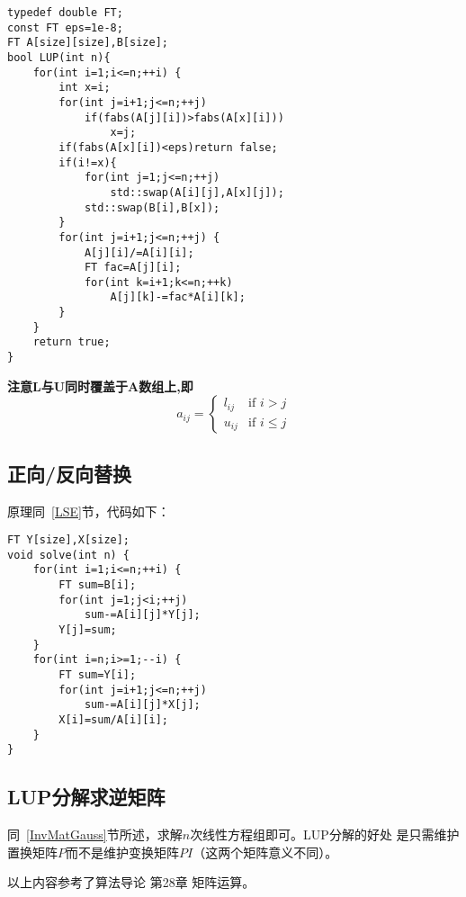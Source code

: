 \begin{lstlisting}
typedef double FT;
const FT eps=1e-8;
FT A[size][size],B[size];
bool LUP(int n){
    for(int i=1;i<=n;++i) {
        int x=i;
        for(int j=i+1;j<=n;++j)
            if(fabs(A[j][i])>fabs(A[x][i]))
                x=j;
        if(fabs(A[x][i])<eps)return false;
        if(i!=x){
            for(int j=1;j<=n;++j)
                std::swap(A[i][j],A[x][j]);
            std::swap(B[i],B[x]);
        }
        for(int j=i+1;j<=n;++j) {
            A[j][i]/=A[i][i];
            FT fac=A[j][i];
            for(int k=i+1;k<=n;++k)
                A[j][k]-=fac*A[i][k];
        }
    }
    return true;
}
\end{lstlisting}
{\bfseries 注意L与U同时覆盖于A数组上,即}
\begin{displaymath}
	a_{ij}=\left\{\begin{array}{ll}
		l_{ij} & \textrm{if $i>j$}     \\
		u_{ij} & \textrm{if $i\leq j$}
	\end{array}\right.
\end{displaymath}
\subsection{正向/反向替换}
原理同~\ref{LSE}节，代码如下：
\begin{lstlisting}
FT Y[size],X[size];
void solve(int n) {
    for(int i=1;i<=n;++i) {
        FT sum=B[i];
        for(int j=1;j<i;++j)
            sum-=A[i][j]*Y[j];
        Y[j]=sum;
    }
    for(int i=n;i>=1;--i) {
        FT sum=Y[i];
        for(int j=i+1;j<=n;++j)
            sum-=A[i][j]*X[j];
        X[i]=sum/A[i][i];
    }
}
\end{lstlisting}
\subsection{LUP分解求逆矩阵}
同~\ref{InvMatGauss}节所述，求解$n$次线性方程组即可。LUP分解的好处
是只需维护置换矩阵$P$而不是维护变换矩阵$PI$（这两个矩阵意义不同）。


以上内容参考了算法导论\cite{ITA3} 第28章 矩阵运算。
